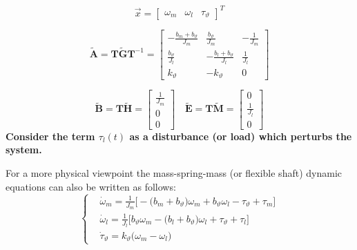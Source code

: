 \documentclass[11pt,a4paper]{article}
\numberwithin{equation}{section}
\theoremstyle{it}
\theoremstyle{definition}
\begin{document}
\begin{mybox}
	\begin{equation*}
		\vec{x} = \left[\begin{matrix} \omega_m&\omega_l&\tau_{\vartheta} 
		\end{matrix} \right]^T
	\end{equation*}
	
	\begin{equation*}
		\tilde{\mathbf{A}} = \mathbf{T}\tilde{\mathbf{G}}\mathbf{T}^{-1} =
		\left[ \begin{matrix}
			-\frac{b_m+b_{\vartheta}}{J_m} & \frac{b_{\vartheta}}{J_m} & 
			-\frac{1}{J_m}\\[6pt]
			\frac{b_{\vartheta}}{J_l} & -\frac{b_l+b_{\vartheta}}{J_l} & 
			\frac{1}{J_l}\\[6pt]
			k_{\vartheta} & -k_{\vartheta} & 0
		\end{matrix}\right]
	\end{equation*}
	
	\begin{equation*}
		\tilde{\mathbf{B}} = \mathbf{T}\tilde{\mathbf{H}} =
		\left[ \begin{matrix}
			\frac{1}{J_m} \\[6pt]
			0 \\[6pt]
			0
		\end{matrix}\right]
		\quad
		\tilde{\mathbf{E}} = \mathbf{T}\tilde{\mathbf{M}} =
		\left[ \begin{matrix}
			0 \\[6pt]
			\frac{1}{J_l} \\[6pt]
			0
		\end{matrix}\right]
	\end{equation*}
	\textbf{Consider the term $\tau_l(t)$ as a disturbance (or load) which perturbs 
		the system.}
	
	\vspace{5mm}
	For a more physical viewpoint the mass-spring-mass (or flexible shaft) dynamic 
	equations can also be written as follows:
	\begin{equation}
		\left\lbrace 
		\begin{aligned}
			& \dot{\omega}_m =\frac{1}{J_m}\Big[ -\big(b_m+b_\vartheta\big)\omega_m+b_{\vartheta}\omega_l - \tau_{\vartheta} + \tau_m\Big] \\[6pt]
			& \dot{\omega}_l = \frac{1}{J_l}\Big[b_\vartheta\omega_m-\big(b_l+b_{\vartheta}\big)\omega_l+ 
			\tau_{\vartheta} + \tau_l\Big] \\[6pt]
			& \dot{\tau}_{\vartheta} = k_{\vartheta}\big(\omega_m-\omega_l\big) 
		\end{aligned}
		\right. 
	\end{equation}
\end{mybox}
\end{document}
